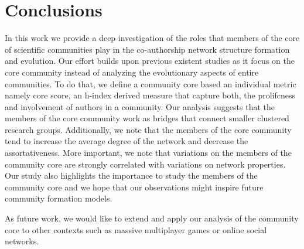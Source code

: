 
\section{Conclusions}

In this work we provide a deep investigation of the roles that members of the core of scientific communities play in the co-authorship network structure formation and evolution.
Our effort builds upon previous existent studies as it focus on the core community instead of analyzing the evolutionary aspects of entire communities.  To do that, we define a
community core based an individual metric namely core score, an h-index derived measure that capture both, the prolifcness and involvement of authors in a community. Our analysis
suggests that the members of the core community work as bridges that connect smaller clustered research groups. Additionally, we note that the members of the core community tend to
increase the average degree of the network and decrease the assortativeness. More important, we note that variations on the members of the community core are strongly correlated
with variations on network properties.  Our study also highlights the importance to study the members of the community core and we hope that our observations might inspire future
community formation models.

As future work, we would like to extend and apply our analysis of the community core to other contexts such as massive multiplayer games or online social networks.



